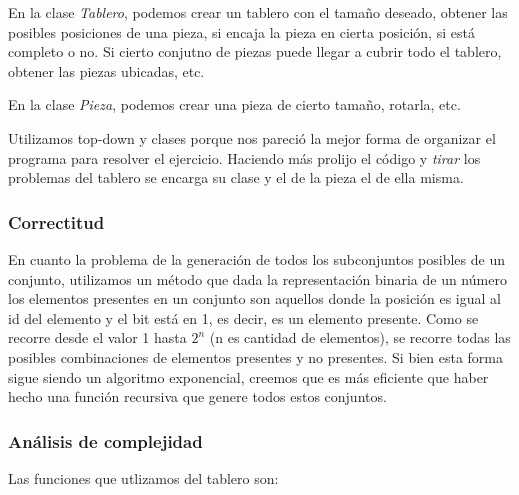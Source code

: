 \quad En la clase \textit{Tablero}, podemos crear un tablero con el tama\~no deseado, obtener las posibles posiciones de una pieza, si encaja la pieza en cierta posici\'on, si est\'a completo o no. Si cierto conjutno de piezas puede llegar a cubrir todo el tablero, obtener las piezas ubicadas, etc.

\quad En la clase \textit{Pieza}, podemos crear una pieza de cierto tama\~no, rotarla, etc.

\quad Utilizamos top-down y clases porque nos pareci\'o la mejor forma de organizar el programa para resolver el ejercicio. Haciendo m\'as prolijo el c\'odigo y \textit{tirar} los problemas del tablero se encarga su clase y el de la pieza el de ella misma.



\subsubsection{Correctitud}

\quad En cuanto la problema de la generaci\'on de todos los subconjuntos posibles de un conjunto, utilizamos un m\'etodo que dada la representaci\'on binaria de un n\'umero los elementos presentes en un conjunto son aquellos donde la posici\'on es igual al id del elemento y el bit est\'a en 1, es decir, es un elemento presente. Como se recorre desde el valor 1 hasta $ 2^{n} $ (n es cantidad de elementos), se recorre todas las posibles  combinaciones de elementos presentes y no presentes. Si bien esta forma sigue siendo un algoritmo exponencial, creemos que es m\'as eficiente que haber hecho una funci\'on recursiva que genere todos estos conjuntos.

\subsubsection{An\'alisis de complejidad}

Las funciones que utlizamos del tablero son:


